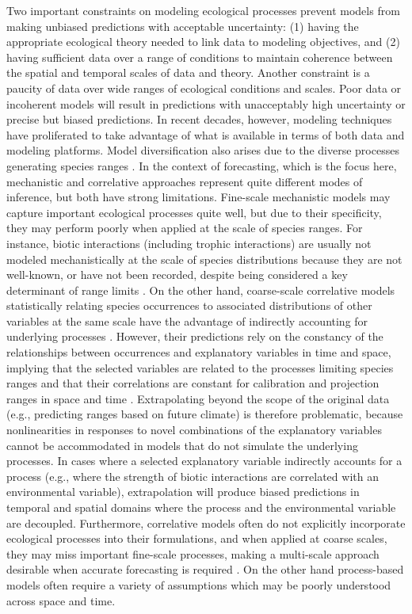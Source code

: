 Two important constraints on modeling ecological processes prevent models from making unbiased predictions with acceptable uncertainty: (1) having the appropriate ecological theory needed to link data to modeling objectives, and (2) having sufficient data over a range of conditions to maintain coherence between the spatial and temporal scales of data and theory.
Another constraint is a paucity of data over wide ranges of ecological conditions and scales.
Poor data or incoherent models will result in predictions with unacceptably high uncertainty or precise but biased predictions.
In recent decades, however, modeling techniques have proliferated to take advantage of what is available in terms of both data and modeling platforms.
Model diversification also arises due to the diverse processes generating species ranges \citep{Soberon2007}.
In the context of forecasting, which is the focus here, mechanistic and correlative approaches represent quite different modes of inference, but both have strong limitations. 
Fine-scale mechanistic models may capture important ecological processes quite well, but due to their specificity, they may perform poorly when applied at the scale of species ranges.
For instance, biotic interactions (including trophic interactions) are usually not modeled mechanistically at the scale of species distributions because they are not well-known, or have not been recorded, despite being considered a key determinant of range limits \citep{Holt2005, Soberon2007, Roux2012, Guo2013, Pigot2013}. 
On the other hand, coarse-scale correlative models statistically relating species occurrences to associated distributions of other variables at the same scale have the advantage of indirectly accounting for underlying processes \citep{Guisan2000}.
However, their predictions rely on the constancy of the relationships between occurrences and explanatory variables in time and space, implying that the selected variables are related to the processes limiting species ranges and that their correlations are constant for calibration and projection ranges in space and time \citep{Dormann2007}. 
Extrapolating beyond the scope of the original data (e.g., predicting ranges based on future climate) is therefore problematic, because nonlinearities in responses to novel combinations of the explanatory variables cannot be accommodated in models that do not simulate the underlying processes.
In cases where a selected explanatory variable indirectly accounts for a process (e.g., where the strength of biotic interactions are correlated with an environmental variable), extrapolation will produce biased predictions in temporal and spatial domains where the process and the environmental variable are decoupled.
Furthermore, correlative models often do not explicitly incorporate ecological processes into their formulations, and when applied at coarse scales, they may miss important fine-scale processes, making a multi-scale approach desirable when accurate forecasting is required \citep{Austin2011, Thuiller2013}.
On the other hand process-based models often require a variety of assumptions which may be poorly understood across space and time.

